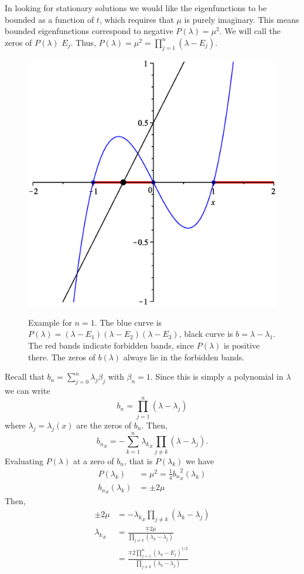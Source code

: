 \documentclass[12pt, a4paper]{article}
\begin{document}
In looking for stationary solutions we would like the eigenfunctions to
be bounded as a function of $t$, which requires that $\mu$ is purely
imaginary.  This means bounded eigenfunctions correspond to negative
$P(\lambda) = \mu^2$.  We will call the zeros of $P(\lambda)$ $E_j$.
Thus, $P(\lambda) = \mu^2 = \prod_{j=1}^n (\lambda-E_j)$.

\begin{figure}[h]
  \centering
  \includegraphics[scale=0.4]{./img/allowedbands.eps}\\
  \caption{Example for $n = 1$. The blue curve is $P(\lambda) = (\lambda
    - E_1)(\lambda-E_2)(\lambda-E_3)$, black curve is $b = \lambda -
    \lambda_1$. The red bands indicate forbidden bands, since
    $P(\lambda)$ is positive there. The zeros of $b(\lambda)$ always lie
    in the forbidden bands.}
  \label{fig:two}
\end{figure}

Recall that $b_n = \sum_{j=0}^n \lambda_j \beta_j$ with $\beta_n = 1$.
Since this is simply a polynomial in $\lambda$ we can write
\[
  b_n = \prod_{j=1}^n (\lambda-\lambda_j)
\]
where $\lambda_j = \lambda_j(x)$ are the zeros of $b_n$.  Then,
\[
  {b_n}_x = -\sum_{k=1}^n {\lambda_k}_x \prod_{j\neq k} (\lambda-\lambda_j).
\]
Evaluating $P(\lambda)$ at a zero of $b_n$, that is $P(\lambda_k)$ we
have
\begin{align*}
  P(\lambda_k) &=
  \mu^2
  =
  \tfrac{1}{4} {b_n}_x^2(\lambda_k) \\
  {b_n}_x(\lambda_k)
  &=
  \pm 2 \mu
\end{align*}
Then,
\begin{align*}
  \pm 2 \mu
  &=
  -{\lambda_k}_x \prod_{j\neq k} (\lambda_k - \lambda_j) \\
  {\lambda_k}_x
  &=
  \frac{\mp 2\mu}{\prod_{j\neq k} (\lambda_k - \lambda_j)} \\
  &=
  \frac{
    \mp 2 \prod_{j=1}^n (\lambda_k - E_j)^{1/2}
  }{
    \prod_{j\neq k} (\lambda_k - \lambda_j)
  }
\end{align*}
\end{document}
